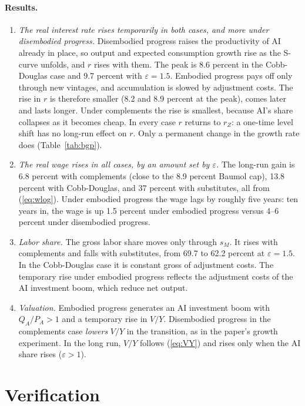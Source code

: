 \documentclass[11pt]{article}
\newcommand{\e}{\varepsilon}
\begin{document}
\paragraph{Results.}
\begin{enumerate}
\item \emph{The real interest rate rises temporarily in both cases, and more under
disembodied progress.} Disembodied progress raises the productivity of AI already in
place, so output and expected consumption growth rise as the S-curve unfolds, and $r$
rises with them. The peak is 8.6 percent in the Cobb-Douglas case and 9.7 percent with
$\e=1.5$. Embodied progress pays off only through new vintages, and accumulation is slowed by
adjustment costs. The rise in $r$ is therefore smaller (8.2 and 8.9 percent at the peak),
comes later and lasts longer. Under complements the rise is smallest, because AI's share
collapses as it becomes cheap. In every case $r$ returns to $r_Z$: a one-time
level shift has no long-run effect on $r$. Only a permanent change in the growth rate
does (Table~\ref{tab:bgp}).
\item \emph{The real wage rises in all cases, by an amount set by $\e$.} The
long-run gain is 6.8 percent with complements (close to the 8.9 percent Baumol cap), 13.8
percent with Cobb-Douglas, and 37 percent with substitutes, all from (\ref{eq:wlog}).
Under embodied progress the wage lags by roughly five years: ten years in, the wage is up
1.5 percent under embodied progress versus 4--6 percent under disembodied progress.
\item \emph{Labor share.} The gross labor share moves only through $s_M$. It rises with
complements and falls with substitutes, from 69.7 to 62.2 percent at $\e=1.5$. In the
Cobb-Douglas case it is constant gross of adjustment costs. The temporary rise under
embodied progress reflects the adjustment costs of the AI investment boom, which reduce
net output.
\item \emph{Valuation.} Embodied progress generates an AI investment boom with
$Q_A/P_A>1$ and a temporary rise in $V/Y$. Disembodied progress in the
complements case \emph{lowers} $V/Y$ in the transition, as in the paper's growth
experiment. In the long run, $V/Y$ follows (\ref{eq:VY}) and rises only when the
AI share rises ($\e>1$).
\end{enumerate}

\section{Verification}
\end{document}
